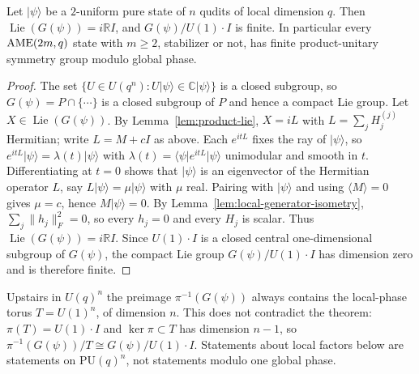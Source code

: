 \begin{theorem}
\label{thm:two-uniform-discrete}
Let \(\lvert\psi\rangle\) be a \(2\)-uniform pure state of \(n\) qudits of
local dimension \(q\).  Then \(\operatorname{Lie}(G(\psi))=i\mathbb RI\),
and \(G(\psi)/U(1)\cdot I\) is finite.  In particular every
\(\mathrm{AME}(2m,q)\) state with \(m\geq2\), stabilizer or not, has finite
product-unitary symmetry group modulo global phase.
\end{theorem}

\begin{proof}
The set \(\{U\in U(q^n):U\lvert\psi\rangle\in\mathbb C\lvert\psi\rangle\}\)
is a closed subgroup, so \(G(\psi)=P\cap\{\cdots\}\) is a closed subgroup
of \(P\) and hence a compact Lie group.  Let
\(X\in\operatorname{Lie}(G(\psi))\).  By Lemma~\ref{lem:product-lie},
\(X=iL\) with \(L=\sum_jH_j^{(j)}\) Hermitian; write \(L=M+cI\) as above.
Each \(e^{itL}\) fixes the ray of \(\lvert\psi\rangle\), so
\(e^{itL}\lvert\psi\rangle=\lambda(t)\lvert\psi\rangle\) with
\(\lambda(t)=\langle\psi\rvert e^{itL}\lvert\psi\rangle\) unimodular and
smooth in \(t\).  Differentiating at \(t=0\) shows that
\(\lvert\psi\rangle\) is an eigenvector of the Hermitian operator \(L\),
say \(L\lvert\psi\rangle=\mu\lvert\psi\rangle\) with \(\mu\) real.  Pairing
with \(\lvert\psi\rangle\) and using \(\langle M\rangle=0\) gives
\(\mu=c\), hence \(M\lvert\psi\rangle=0\).  By
Lemma~\ref{lem:local-generator-isometry}, \(\sum_j\lVert h_j\rVert_F^2=0\),
so every \(h_j=0\) and every \(H_j\) is scalar.  Thus
\(\operatorname{Lie}(G(\psi))=i\mathbb RI\).  Since \(U(1)\cdot I\) is a
closed central one-dimensional subgroup of \(G(\psi)\), the compact Lie
group \(G(\psi)/U(1)\cdot I\) has dimension zero and is therefore finite.
\end{proof}

\begin{remark}
\label{rem:local-phase-torus}
Upstairs in \(U(q)^n\) the preimage \(\pi^{-1}(G(\psi))\) always contains
the local-phase torus \(T=U(1)^n\), of dimension \(n\).  This does not
contradict the theorem: \(\pi(T)=U(1)\cdot I\) and \(\ker\pi\subset T\) has
dimension \(n-1\), so
\(\pi^{-1}(G(\psi))/T\cong G(\psi)/U(1)\cdot I\).  Statements about local
factors below are statements on \(\mathrm{PU}(q)^n\), not statements
modulo one global phase.
\end{remark}

